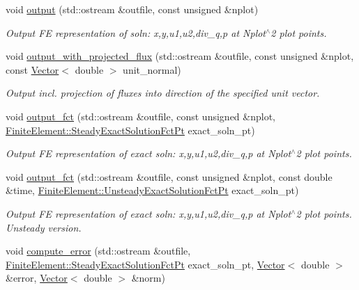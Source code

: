 \begin{DoxyCompactItemize}
void \hyperlink{classoomph_1_1AxisymmetricPoroelasticityEquations_af5dcc8768f5323427ebaf17cad67a64a}{output} (std\+::ostream \&outfile, const unsigned \&nplot)
\begin{DoxyCompactList}\small\item\em Output FE representation of soln\+: x,y,u1,u2,div\+\_\+q,p at Nplot$^\wedge$2 plot points. \end{DoxyCompactList}\item 
void \hyperlink{classoomph_1_1AxisymmetricPoroelasticityEquations_a21f1843bd23883a80628f565c7133bcd}{output\+\_\+with\+\_\+projected\+\_\+flux} (std\+::ostream \&outfile, const unsigned \&nplot, const \hyperlink{classoomph_1_1Vector}{Vector}$<$ double $>$ unit\+\_\+normal)
\begin{DoxyCompactList}\small\item\em Output incl. projection of fluxes into direction of the specified unit vector. \end{DoxyCompactList}\item 
void \hyperlink{classoomph_1_1AxisymmetricPoroelasticityEquations_ad07311da4796c1481750d4e5872f3aff}{output\+\_\+fct} (std\+::ostream \&outfile, const unsigned \&nplot, \hyperlink{classoomph_1_1FiniteElement_a690fd33af26cc3e84f39bba6d5a85202}{Finite\+Element\+::\+Steady\+Exact\+Solution\+Fct\+Pt} exact\+\_\+soln\+\_\+pt)
\begin{DoxyCompactList}\small\item\em Output FE representation of exact soln\+: x,y,u1,u2,div\+\_\+q,p at Nplot$^\wedge$2 plot points. \end{DoxyCompactList}\item 
void \hyperlink{classoomph_1_1AxisymmetricPoroelasticityEquations_a44ae25afaa082449111d9f2c0eb0f638}{output\+\_\+fct} (std\+::ostream \&outfile, const unsigned \&nplot, const double \&time, \hyperlink{classoomph_1_1FiniteElement_ad4ecf2b61b158a4b4d351a60d23c633e}{Finite\+Element\+::\+Unsteady\+Exact\+Solution\+Fct\+Pt} exact\+\_\+soln\+\_\+pt)
\begin{DoxyCompactList}\small\item\em Output FE representation of exact soln\+: x,y,u1,u2,div\+\_\+q,p at Nplot$^\wedge$2 plot points. Unsteady version. \end{DoxyCompactList}\item 
void \hyperlink{classoomph_1_1AxisymmetricPoroelasticityEquations_a1d33152b3b357c4a54cc3d603381703d}{compute\+\_\+error} (std\+::ostream \&outfile, \hyperlink{classoomph_1_1FiniteElement_a690fd33af26cc3e84f39bba6d5a85202}{Finite\+Element\+::\+Steady\+Exact\+Solution\+Fct\+Pt} exact\+\_\+soln\+\_\+pt, \hyperlink{classoomph_1_1Vector}{Vector}$<$ double $>$ \&error, \hyperlink{classoomph_1_1Vector}{Vector}$<$ double $>$ \&norm)

\end{DoxyCompactItemize}
